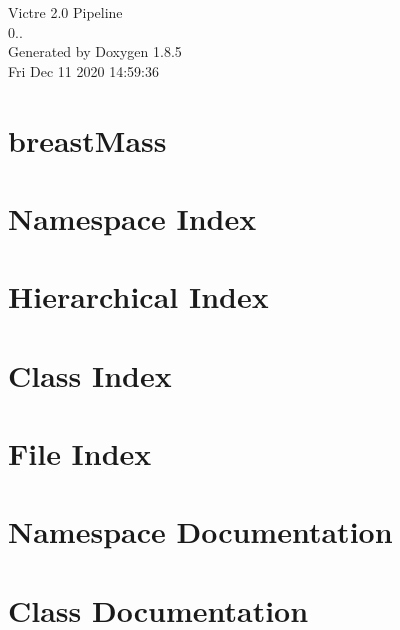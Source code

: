 \documentclass[twoside]{book}
\newcommand{\clearemptydoublepage}{%
  \newpage{\pagestyle{empty}\cleardoublepage}%
}
\begin{document}
\hypersetup{pageanchor=false}
\begin{titlepage}
\vspace*{7cm}
\begin{center}%
{\Large Victre 2.0 Pipeline \\[1ex]\large 0.. }\\
\vspace*{1cm}
{\large Generated by Doxygen 1.8.5}\\
\vspace*{0.5cm}
{\small Fri Dec 11 2020 14:59:36}\\
\end{center}
\end{titlepage}
\clearemptydoublepage
\tableofcontents
\clearemptydoublepage
{}
\hypersetup{pageanchor=true}

\chapter{breast\-Mass}
\label{md_Victre_breastMass_README}
\hypertarget{md_Victre_breastMass_README}{}

\chapter{Namespace Index}

\chapter{Hierarchical Index}

\chapter{Class Index}

\chapter{File Index}

\chapter{Namespace Documentation}










\chapter{Class Documentation}



\end{document}
